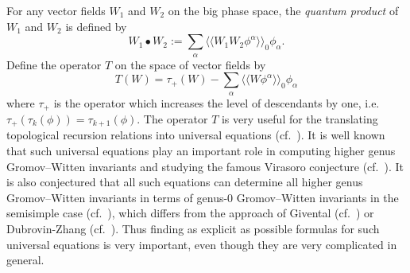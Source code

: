 \documentclass[12pt,reqno]{amsart}
\theoremstyle{plain}
\theoremstyle{definition}
\theoremstyle{remark}
\begin{document}
%
%
%
For any vector fields $W_{1}$ and $W_{2}$ on the big phase space, the {\it quantum product} of $W_{1}$ and $W_{2}$ is defined by
$$W_{1}\bullet W_{2}:=\sum_{\alpha}\langle\langle{W_{1}W_{2}
\phi^{\alpha}}\rangle\rangle_0\phi_{\alpha}.$$
Define
the operator $T$ on the space of vector fields by
\[T(W)=\tau_{+}(W)-\sum_{\alpha}\langle\langle W\phi^\alpha\rangle\rangle_0\phi_\alpha\]
where  $\tau_{+}$ is the operator which increases  the level of descendants by one, i.e.\ $\tau_+(\tau_k(\phi)) = \tau_{k + 1}(\phi)$.
The operator $T$ is very useful for
the translating topological recursion relations  into universal equations (cf.\ \cite{liu2006gromov}). 
It is well known that such universal equations play an important role in computing higher genus Gromov--Witten invariants and studying the famous Virasoro conjecture (cf.\ \cite{liu2002quantum}).
It is also conjectured that all such equations can determine all higher genus Gromov--Witten invariants  in terms of genus-0 Gromov--Witten invariants in the semisimple case (cf.\ \cite{liu2006gromov}), which differs from the approach of Givental (cf.\ \cite{givental2001semisimple}) or Dubrovin-Zhang (cf.\ \cite{dubrovin1998bihamiltonian}).   
Thus finding as explicit as possible formulas for such universal  equations is very important, even though they are very complicated in general.
\end{document}
